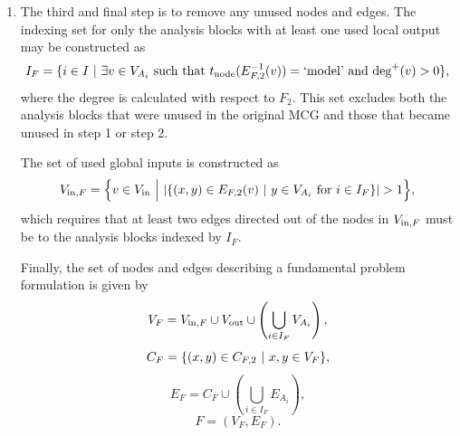 \begin{enumerate}
\item The third and final step is to remove any unused nodes and edges. The indexing set for only the analysis blocks with at least one used local output may be constructed as
\begin{equation}
I_F =  \{i \in I \ | \ \exists v \in V_{A_i} \textrm{ such that }  t_\textrm{node}(E_{F,2}^{-1}(v))=\textrm{`model'} \textrm{ and } \textrm{deg}^+(v) > 0 \},
\end{equation}
where the degree is calculated with respect to $F_2$. This set excludes both the analysis blocks that were unused in the original MCG and those that became unused in step 1 or step 2.

The set of used global inputs is constructed as
\begin{equation}
V_{\txt{in},F} = \Big\{v \in V_\txt{in} \ \Big| \ |\{(x,y) \in E_{F,2}(v) \st y \in V_{A_i} \txt{ for } i \in I_F  \}| > 1 \Big\},
\end{equation}
which requires that at least two edges directed out of the nodes in $V_{\textrm{in},F}$ must be to the analysis blocks indexed by $I_F$.

Finally, the set of nodes and edges describing a fundamental problem formulation is given by
\begin{equation}
V_F = V_{\textrm{in},F} \cup V_\textrm{out} \cup \left( \bigcup_{i \in I_F} V_{A_i} \right),
\end{equation}
\begin{equation}
C_{F} = \{ (x,y) \in C_{F,2} \ | \  x,y \in V_F\},
\end{equation}
\begin{equation}
E_F = C_F \cup \left( \bigcup_{i \in I_F} E_{A_i} \right),
\end{equation}
\begin{equation}
F = (V_F,E_F).
\end{equation}





\end{enumerate}

